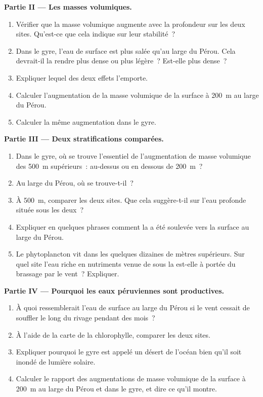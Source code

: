 \begin{problem}
\medskip
\noindent\textbf{Partie II --- Les masses volumiques.}
\begin{enumerate}[resume]
  \item Vérifier que la masse volumique augmente avec la profondeur sur les
        deux sites. Qu'est-ce que cela indique sur leur stabilité~?
  \item Dans le gyre, l'eau de surface est plus salée qu'au large du Pérou.
        Cela devrait-il la rendre plus dense ou plus légère~? Est-elle plus
        dense~?
  \item Expliquer lequel des deux effets l'emporte.
  \item Calculer l'augmentation de la masse volumique de la surface à
        \qty{200}{m} au large du Pérou.
  \item Calculer la même augmentation dans le gyre.
\end{enumerate}

\medskip
\noindent\textbf{Partie III --- Deux stratifications comparées.}
\begin{enumerate}[resume]
  \item Dans le gyre, où se trouve l'essentiel de l'augmentation de masse
        volumique des \qty{500}{m} supérieurs~: au-dessus ou en dessous de
        \qty{200}{m}~?
  \item Au large du Pérou, où se trouve-t-il~?
  \item À \qty{500}{m}, comparer les deux sites. Que cela suggère-t-il sur
        l'eau profonde située sous les deux~?
  \item Expliquer en quelques phrases comment la  a été soulevée
        vers la surface au large du Pérou.
  \item Le phytoplancton vit dans les quelques dizaines de mètres
        supérieurs. Sur quel site l'eau riche en nutriments venue de sous la
         est-elle à portée du brassage par le vent~? Expliquer.
\end{enumerate}

\medskip
\noindent\textbf{Partie IV --- Pourquoi les eaux péruviennes sont productives.}
\begin{enumerate}[resume]
  \item À quoi ressemblerait l'eau de surface au large du Pérou si le vent
        cessait de souffler le long du rivage pendant des mois~?
  \item À l'aide de la carte de la chlorophylle, comparer les deux sites.
  \item Expliquer pourquoi le gyre est appelé un désert de l'océan bien
        qu'il soit inondé de lumière solaire.
  \item Calculer le rapport des augmentations de masse volumique de la
        surface à \qty{200}{m} au large du Pérou et dans le gyre, et dire ce
        qu'il montre.
\end{enumerate}
\end{problem}
